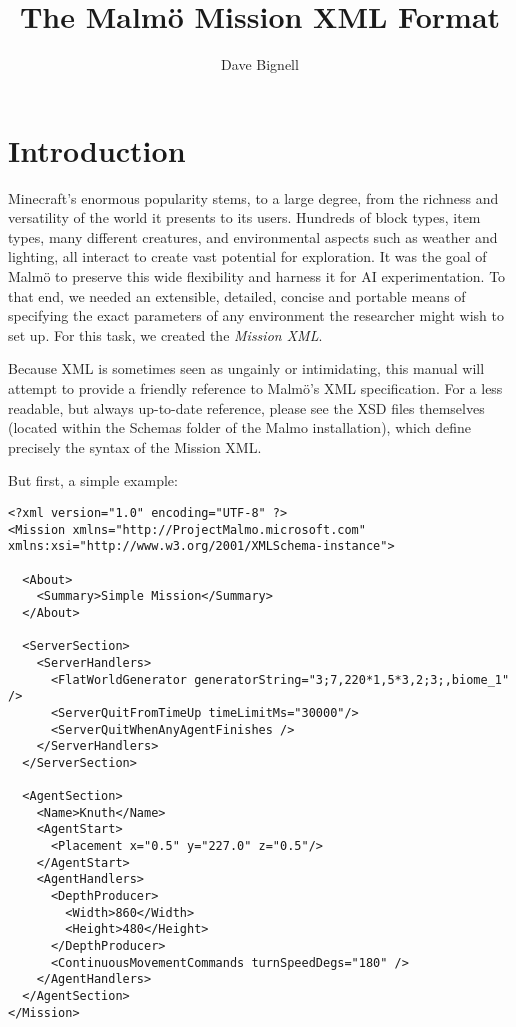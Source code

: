 \documentclass[11pt]{article} %
\title{The Malm\"o Mission XML Format}
\author{Dave Bignell}
\begin{document}
\maketitle

\section{Introduction}

Minecraft's enormous popularity stems, to a large degree, from the richness and versatility of the world it presents to its 
users. Hundreds of block types, item types, many different creatures, and environmental aspects such as weather and lighting, 
all interact to create vast potential for exploration. It was the goal of Malm\"o to preserve this wide flexibility and harness 
it for AI experimentation. To that end, we needed an extensible, detailed, concise and portable means of specifying the exact 
parameters of any environment the researcher might wish to set up. For this task, we created the \emph{Mission XML}.

Because XML is sometimes seen as ungainly or intimidating, this manual will attempt to provide a friendly reference to Malm\"o's XML specification. For a less readable, but always up-to-date reference, please see the XSD files themselves (located within the Schemas folder of the Malmo installation), which define precisely the syntax of the Mission XML.

But first, a simple example:

\begin{lstlisting}[frame=lines]
<?xml version="1.0" encoding="UTF-8" ?>
<Mission xmlns="http://ProjectMalmo.microsoft.com" xmlns:xsi="http://www.w3.org/2001/XMLSchema-instance">
    
  <About>
    <Summary>Simple Mission</Summary>
  </About>

  <ServerSection>
    <ServerHandlers>
      <FlatWorldGenerator generatorString="3;7,220*1,5*3,2;3;,biome_1" />
      <ServerQuitFromTimeUp timeLimitMs="30000"/>
      <ServerQuitWhenAnyAgentFinishes />
    </ServerHandlers>
  </ServerSection>

  <AgentSection>
    <Name>Knuth</Name>
    <AgentStart>
      <Placement x="0.5" y="227.0" z="0.5"/>
    </AgentStart>
    <AgentHandlers>
      <DepthProducer>
        <Width>860</Width>
        <Height>480</Height>
      </DepthProducer>
      <ContinuousMovementCommands turnSpeedDegs="180" />
    </AgentHandlers>
  </AgentSection>
</Mission>
\end{lstlisting}  
\end{document}
